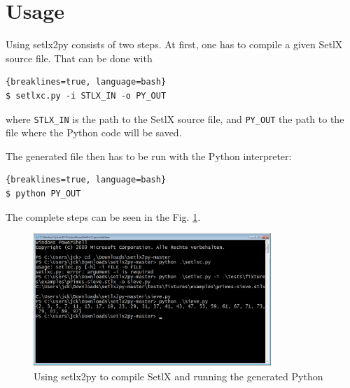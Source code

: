
\section{Usage}

Using setlx2py consists of two steps. At first, one has to compile a given SetlX source file. That can be done with

\begin{lstlisting}{breaklines=true, language=bash}
$ setlxc.py -i STLX_IN -o PY_OUT
\end{lstlisting}

where \texttt{STLX\_IN} is the path to the SetlX source file, and \texttt{PY\_OUT} the path to the file where the Python code will be saved.

The generated file then has to be run with the Python interpreter:

\begin{lstlisting}{breaklines=true, language=bash}
$ python PY_OUT
\end{lstlisting}

The complete steps can be seen in the Fig. \ref{fig:use-sieve}.

\begin{figure}[ht]
    \centering
    \includegraphics[width=0.8\textwidth]{img/sieve.png}
    \caption{Using setlx2py to compile SetlX and running the generated Python}
    \label{fig:use-sieve}
\end{figure}